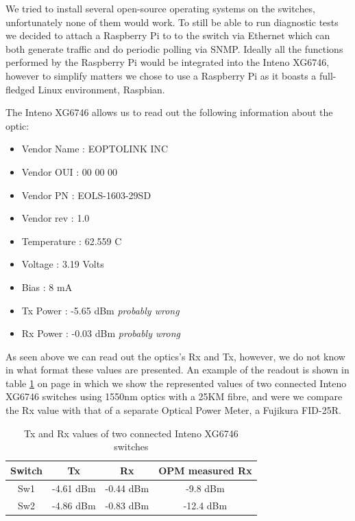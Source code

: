 \documentclass{article}
\begin{document}
We tried to install several open-source operating systems on the switches, unfortunately none of them would work. To still be able to run diagnostic tests we decided to attach a Raspberry Pi to to the switch via Ethernet which can both generate traffic and do periodic polling via SNMP.
Ideally all the functions performed by the Raspberry Pi would be integrated into the Inteno XG6746, however to simplify matters we chose to use a Raspberry Pi as it boasts a full-fledged Linux environment, Raspbian\cite{raspbian:raspbian}.

The Inteno XG6746 allows us to read out the following information about the optic:
\begin{itemize}
	\item Vendor Name : EOPTOLINK INC   
	\item Vendor OUI  : 00 00 00
	\item Vendor PN   : EOLS-1603-29SD  
	\item Vendor rev  : 1.0 
	\item Temperature : 62.559 C
	\item Voltage     : 3.19 Volts
	\item Bias        : 8 mA
	\item Tx Power    : -5.65 dBm \emph{probably wrong}
	\item Rx Power    : -0.03 dBm \emph{probably wrong}
\end{itemize}

As seen above we can read out the optics’s Rx and Tx, however, we do not know in what format these values are presented. An example of the readout is shown in table \ref{tab:crazy-inteno} on page \pageref{tab:crazy-inteno} in which we show the represented values of two connected Inteno XG6746 switches using 1550nm optics with a 25KM fibre, and were we compare the Rx value with that of a separate Optical Power Meter, a Fujikura FID-25R.

\begin{table}[h]
\centering
\label{tab:crazy-inteno}
\begin{tabular}{|c|c|c|c|}
\hline 
\textbf{Switch} & \textbf{Tx} & \textbf{Rx} & \textbf{OPM measured Rx}\\ 
\hline 
Sw1 & -4.61 dBm & -0.44 dBm & -9.8 dBm\\ 
\hline 
Sw2 & -4.86 dBm & -0.83 dBm  & -12.4 dBm \\ 
\hline 
\end{tabular} 
\caption{Tx and Rx values of two connected Inteno XG6746 switches}
\end{table}
\end{document}
